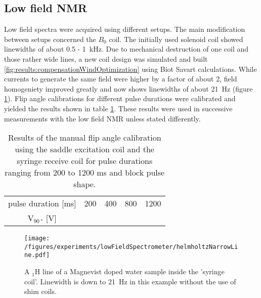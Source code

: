     \subsection{Low field NMR}
    \label{chap:results:lowFieldNMR}
        Low field spectra were acquired using different setups. The main modification between setups concerned the $B_0$ coil. The initially used solenoid coil showed linewidths of about 0.5 - \SI{1}{\kilo\hertz}. Due to mechanical destruction of one coil and those rather wide lines, a new coil design was simulated and built \ref{fig:results:compensationWindOptimization} using Biot Savart calculations. While currents to generate the same field were higher by a factor of about 2, field homogeniety improved greatly and now shows linewidths of about \SI{21}{\hertz} (figure \ref{results:lowFieldSpectrometer:thinLine}). Flip angle calibrations for different pulse durations were calibrated and yielded the results shown in table \ref{table:results:FA}. These results were used in successive measurements with the low field NMR unless stated differently.
        \begin{table}
            \centering
            \begin{tabular}{ccccc}
                pulse duration [ms] & 200 &  400 & 800 & 1200 \\
                $\mathrm{V}_{\SI{90}{\degree}}$ [V] & & & & 
            \end{tabular} 
            \label{table:results:FA}
            \caption[Flip angle calibration results]{Results of the manual flip angle calibration using the saddle excitation coil and the syringe receive coil for pulse durations ranging from 200 to 1200 ms and block pulse shape.}
        \end{table}
            \begin{figure}
                \centering
                \texttt{[image: /figures/experiments/lowFieldSpectrometer/helmholtzNarrowLine.pdf]}
                \caption[Thin line helmholtz coils]{A $_1\mathrm{H}$ line of a Magnevist doped water sample inside the 'syringe coil'. Linewidth is down to \SI{21}{\hertz} in this example without the use of shim coils.}
                \label{results:lowFieldSpectrometer:thinLine}
            \end{figure}
